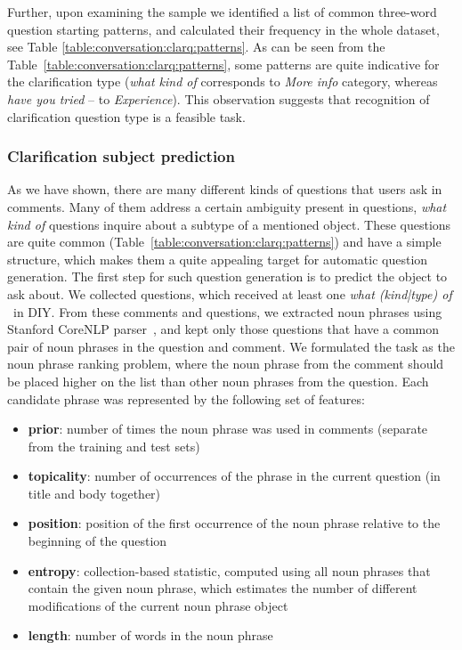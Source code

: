 Further, upon examining the sample we identified a list of common three-word question starting patterns, and calculated their frequency in the whole dataset, see Table \ref{table:conversation:clarq:patterns}. 
As can be seen from the Table~\ref{table:conversation:clarq:patterns}, some patterns are quite indicative for the clarification type (\eg \textit{what kind of} corresponds to \textit{More info} category, whereas \textit{have you tried} -- to \textit{Experience}).
This observation suggests that recognition of clarification question type is a feasible task.


\subsubsection{Clarification subject prediction}
\label{section:conversation:clarq:subj-prediction}

As we have shown, there are many different kinds of questions that users ask in comments.
Many of them address a certain ambiguity present in questions, \eg \textit{what kind of} questions inquire about a subtype of a mentioned object.
These questions are quite common (Table~\ref{table:conversation:clarq:patterns}) and have a simple structure, which makes them a quite appealing target for automatic question generation.
The first step for such question generation is to predict the object to ask about.
We collected questions, which received at least one \textit{what (kind|type) of} \clarQ~in DIY. 
From these comments and questions, we extracted noun phrases using Stanford CoreNLP parser~\cite{manning-EtAl:2014:P14-5}, and kept only those questions that have a common pair of noun phrases in the question and comment.
We formulated the task as the noun phrase ranking problem, where the noun phrase from the comment should be placed higher on the list than other noun phrases from the question.
Each candidate phrase was represented by the following set of features:
\begin{itemize}[itemsep=0em]
\item \textbf{prior}: number of times the noun phrase was used in comments (separate from the training and test sets)
\item \textbf{topicality}: number of occurrences of the phrase in the current question (in title and body together)
\item \textbf{position}: position of the first occurrence of the noun phrase relative to the beginning of the question
\item \textbf{entropy}: collection-based statistic, computed using all noun phrases that contain the given noun phrase, which estimates the number of different modifications of the current noun phrase object
\item \textbf{length}: number of words in the noun phrase
\end{itemize}

